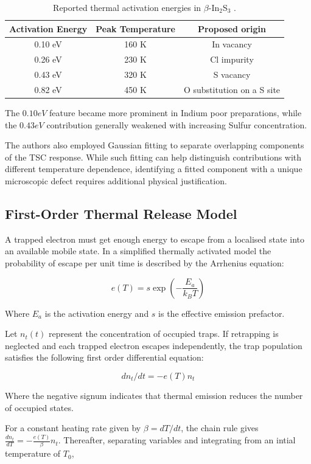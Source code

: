\documentclass[letterpaper, 10pt, conference]{ieeeconf}
\begin{document}
\begin{table}[H]
\caption{Reported thermal activation energies in $\beta$-In$_2$S$_3$ \cite{pai}.}
\label{tab:traps}
\centering\footnotesize
\begin{tabular}{@{}ccc@{}}\toprule
Activation Energy & Peak Temperature & Proposed origin\\\midrule
0.10 eV & 160 K & In vacancy\\
0.26 eV & 230 K & Cl impurity\\
0.43 eV & 320 K & S vacancy\\
0.82 eV & 450 K & O substitution on a S site\\\bottomrule
\end{tabular}
\end{table}

The $0.10 eV$ feature became more prominent in Indium poor preparations, while the $0.43 eV$ contribution generally weakened with increasing Sulfur concentration.

The authors also employed Gaussian fitting to separate overlapping components of the TSC response. While such fitting can help distinguish contributions with different temperature dependence, identifying a fitted component with a unique microscopic defect requires additional physical justification.

\subsection{First-Order Thermal Release Model}
A trapped electron must get enough energy to escape from a localised state into an available mobile state.
In a simplified thermally activated model the probability of escape per unit time is described by the Arrhenius equation:

$$ e(T)=s\exp\!\left(-\frac{E_a}{k_BT}\right) $$

Where $E_a$ is the activation energy and $s$ is the effective emission prefactor.

Let $n_t(t)$ represent the concentration of occupied traps. If retrapping is neglected and each trapped electron escapes independently, the trap population satisfies the following first order differential equation:

$$ dn_t/dt = -e(T)n_t $$

Where the negative signum indicates that thermal emission reduces the number of occupied states.

For a constant heating rate given by $\beta = dT/dt$, the chain rule gives $\frac{dn_t}{dT} = -\frac{e(T)}{\beta}n_t$. Thereafter, separating variables and integrating from an intial temperature of $T_0$,
\end{document}

